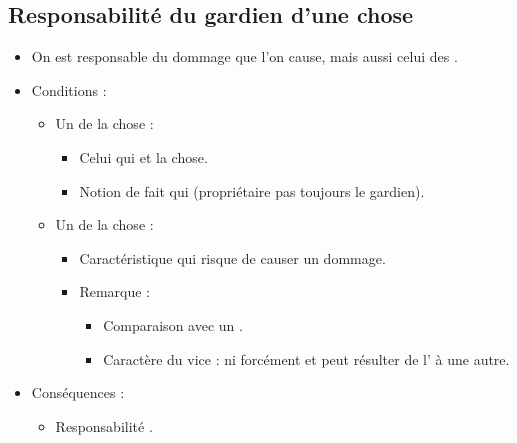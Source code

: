 \subsection{Responsabilité du gardien d'une chose}
\begin{itemize}
	\item On est responsable du dommage que l'on cause, mais aussi celui des .
	\item Conditions :
	\begin{itemize}
		\item Un  de la chose :
		\begin{itemize}
			\item Celui qui  et  la chose.
			\item Notion de fait qui  (propriétaire pas toujours le gardien).
		\end{itemize}
		\item Un  de la chose :
		\begin{itemize}
			\item Caractéristique  qui risque de causer un dommage.
			\item Remarque : 
			\begin{itemize}
				\item Comparaison avec un .
				\item Caractère du vice :  ni forcément  et peut résulter de l' à une autre.
			\end{itemize}
		\end{itemize}
	\end{itemize}
	\item Conséquences :
	\begin{itemize}
		\item Responsabilité .
	\end{itemize}
\end{itemize}

